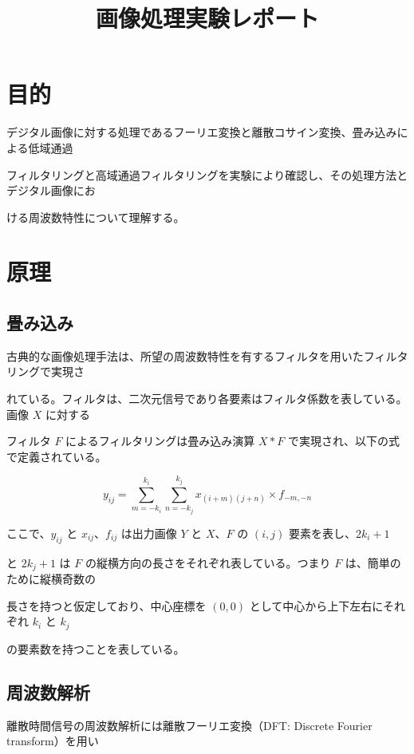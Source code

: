 \documentclass[dvipdfmx]{jsarticle}
\title{画像処理実験レポート}
\author{}
\date{}
\begin{document}
\maketitle


\section{目的}

デジタル画像に対する処理であるフーリエ変換と離散コサイン変換、畳み込みによる低域通過

フィルタリングと高域通過フィルタリングを実験により確認し、その処理方法とデジタル画像にお

ける周波数特性について理解する。

\section{原理}

\subsection{畳み込み}

古典的な画像処理手法は、所望の周波数特性を有するフィルタを用いたフィルタリングで実現さ

れている。フィルタは、二次元信号であり各要素はフィルタ係数を表している。画像 $X$ に対する

フィルタ $F$ によるフィルタリングは畳み込み演算 $X \ast F$ で実現され、以下の式で定義されている。



\begin{equation}
y_{ij} =
\sum_{m=-k_i}^{k_i}
\sum_{n=-k_j}^{k_j}
x_{(i+m)(j+n)} \times f_{-m,-n}
\tag{1}
\end{equation}

ここで、$y_{ij}$ と $x_{ij}$、$f_{ij}$ は出力画像 $Y$ と $X$、$F$ の $(i,j)$ 要素を表し、$2k_i+1$

と $2k_j+1$ は $F$ の縦横方向の長さをそれぞれ表している。つまり $F$ は、簡単のために縦横奇数の

長さを持つと仮定しており、中心座標を $(0,0)$ として中心から上下左右にそれぞれ $k_i$ と $k_j$

の要素数を持つことを表している。

\subsection{周波数解析}

離散時間信号の周波数解析には離散フーリエ変換（DFT: Discrete Fourier transform）を用い
\end{document}
